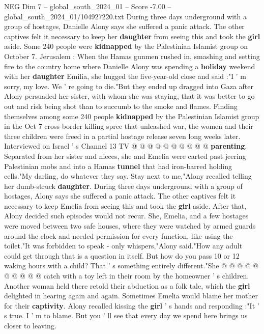 \begin{textsample}{NEG Dim 7 – global\_south\_2024\_01 – Score -7.00 – global\_south\_2024\_01/104927220.txt}  \label{ex:f7_neg_402}
During three days underground with a group of hostages, Danielle Alony says she suffered a panic attack.
The other captives felt it necessary to keep her \textbf{daughter} from seeing this and took the \textbf{girl} aside.
Some 240 people were \textbf{kidnapped} by the Palestinian Islamist group on October 7.
Jerusalem : When the Hamas gunmen rushed in, smashing and setting fire to the country home where Danielle Alony was spending a \textbf{holiday} weekend with her \textbf{daughter} Emilia, she hugged the five-year-old close and said :"I ' m sorry, my love.
We ' re going to die."But they ended up dragged into Gaza after Alony persuaded her sister, with whom she was staying, that it was better to go out and risk being shot than to succumb to the smoke and flames.
Finding themselves among some 240 people \textbf{kidnapped} by the Palestinian Islamist group in the Oct 7 cross-border killing spree that unleashed war, the women and their three children were freed in a partial hostage release seven long weeks later.
Interviewed on Israel ' s Channel 13 TV @ @ @ @ @ @ @ @ @ @ \textbf{parenting}.
Separated from her sister and nieces, she and Emelia were carted past jeering Palestinian mobs and into a Hamas \textbf{tunnel} that had iron-barred holding cells."My darling, do whatever they say.
Stay next to me,"Alony recalled telling her dumb-struck \textbf{daughter}.
During three days underground with a group of hostages, Alony says she suffered a panic attack.
The other captives felt it necessary to keep Emelia from seeing this and took the \textbf{girl} aside.
After that, Alony decided such episodes would not recur.
She, Emelia, and a few hostages were moved between two safe houses, where they were watched by armed guards around the clock and needed permission for every function, like using the toilet."It was forbidden to speak - only whispers,"Alony said."How any adult could get through that is a question in itself.
But how do you pass 10 or 12 waking hours with a child?
That ' s something entirely different."She @ @ @ @ @ @ @ @ @ @ catch with a toy left in their room by the homeowner ' s children.
Another woman held there retold their abduction as a folk tale, which the \textbf{girl} delighted in hearing again and again.
Sometimes Emelia would blame her mother for their \textbf{captivity}.
Alony recalled kissing the \textbf{girl} ' s hands and responding :"It ' s true.
I ' m to blame.
But you ' ll see that every day we spend here brings us closer to leaving.

\end{textsample}
